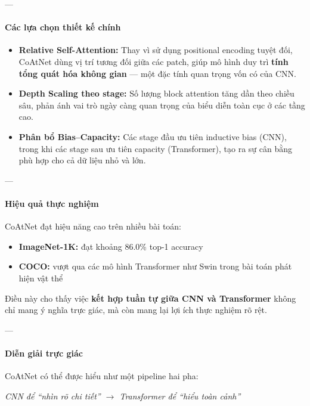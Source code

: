 ---

\paragraph{Các lựa chọn thiết kế chính}

\begin{itemize}
	\item \textbf{Relative Self-Attention:}  
	Thay vì sử dụng positional encoding tuyệt đối, CoAtNet dùng vị trí tương đối giữa các patch, giúp mô hình duy trì \textbf{tính tổng quát hóa không gian} — một đặc tính quan trọng vốn có của CNN.
	
	\item \textbf{Depth Scaling theo stage:}  
	Số lượng block attention tăng dần theo chiều sâu, phản ánh vai trò ngày càng quan trọng của biểu diễn toàn cục ở các tầng cao.
	
	\item \textbf{Phân bổ Bias–Capacity:}  
	Các stage đầu ưu tiên inductive bias (CNN), trong khi các stage sau ưu tiên capacity (Transformer), tạo ra sự cân bằng phù hợp cho cả dữ liệu nhỏ và lớn.
\end{itemize}

---

\paragraph{Hiệu quả thực nghiệm}

CoAtNet đạt hiệu năng cao trên nhiều bài toán:
\begin{itemize}
	\item \textbf{ImageNet-1K:} đạt khoảng 86.0\% top-1 accuracy
	\item \textbf{COCO:} vượt qua các mô hình Transformer như Swin trong bài toán phát hiện vật thể
\end{itemize}

Điều này cho thấy việc \textbf{kết hợp tuần tự giữa CNN và Transformer} không chỉ mang ý nghĩa trực giác, mà còn mang lại lợi ích thực nghiệm rõ rệt.

---

\paragraph{Diễn giải trực giác}

CoAtNet có thể được hiểu như một pipeline hai pha:

\begin{center}
	\textit{CNN để “nhìn rõ chi tiết” $\rightarrow$ Transformer để “hiểu toàn cảnh”}
\end{center}


